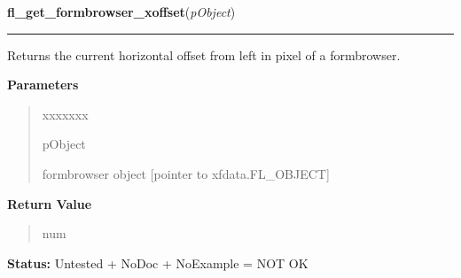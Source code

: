\hspace{.8\funcindent}\begin{boxedminipage}{\funcwidth}

    \raggedright \textbf{fl\_get\_formbrowser\_xoffset}(\textit{pObject})

    \vspace{-1.5ex}

    \rule{\textwidth}{0.5\fboxrule}
\setlength{\parskip}{2ex}
    Returns the current horizontal offset from left in pixel of a 
    formbrowser.

\setlength{\parskip}{1ex}
      \textbf{Parameters}
      \vspace{-1ex}

      \begin{quote}
        \begin{Ventry}{xxxxxxx}

          \item[pObject]

          formbrowser object [pointer to xfdata.FL\_OBJECT]

        \end{Ventry}

      \end{quote}

      \textbf{Return Value}
    \vspace{-1ex}

      \begin{quote}
      num

      \end{quote}

\textbf{Status:} Untested + NoDoc + NoExample = NOT OK



    \end{boxedminipage}

    \label{xformslib:library:fl_get_formbrowser_yoffset}

    \vspace{0.5ex}

